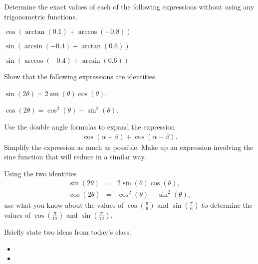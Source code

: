 \begin{problem}
\item Determine the exact values of each of the following expressions
  without using any trigonometric functions.
  \begin{subproblem}
  \item ${\displaystyle \cos(\arctan(0.1)+\arccos(-0.8))}$
    \vfill
  \item ${\displaystyle \sin(\arcsin(-0.4)+\arctan(0.6))}$
    \vfill
  \item ${\displaystyle \sin(\arccos(-0.4)+\arcsin(0.6))}$
    \vfill
  \end{subproblem}

  \clearpage

\item Show that the following expressions are identities.
  \begin{subproblem}
  \item ${\displaystyle \sin(2\theta)=2\sin(\theta)\cos(\theta)}$.
    \vfill
  \item ${\displaystyle \cos(2\theta)=\cos^2(\theta)-\sin^2(\theta)}$.
    \vfill
  \end{subproblem}

  \clearpage

\item Use the double angle formulas to expand the expression
  \begin{eqnarray*}
    \cos(\alpha+\beta) + \cos(\alpha-\beta).
  \end{eqnarray*}
  Simplify the expression as much as possible.  Make up an expression
  involving the sine function that will reduce in a similar way.

  \vfill

  \clearpage

\item Using the two identities
  \begin{eqnarray*}
    \sin(2\theta) & = & 2\sin(\theta)\cos(\theta), \\
    \cos(2\theta) & = & \cos^2(\theta)-\sin^2(\theta),
  \end{eqnarray*}
  use what you know about the values of $\cos\left(\frac{\pi}{6}\right)$ and
    $\sin\left(\frac{\pi}{6}\right)$ to determine the values of
      $\cos\left(\frac{\pi}{12}\right)$ and $\sin\left(\frac{\pi}{12}\right)$.

  \vfill
  
\end{problem}

\postClass

\begin{problem}
\item Briefly state two ideas from today's class.
  \begin{itemize}
  \item 
  \item 
  \end{itemize}
\item 
  \begin{subproblem}
    \item
  \end{subproblem}
\end{problem}



